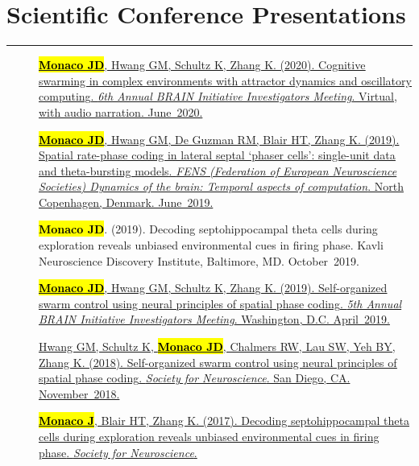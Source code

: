 \documentclass[10pt]{article}
\newcommand{\itemtitle}[1]{{\color{hopkinsblue}\ul{#1}}}
\newcommand{\unpubtitle}[1]{{\color{hopkinsblue} #1}}
\newcommand{\joehl}[1]{\hl{\textbf{#1}}}
\newcommand{\newsection}[2]{%
  \section*{#1}
  \vspace{-.125in}
  \hrule
  \vspace{.22in}
  \label{sec:#2}
}
\begin{document}
\smallskip
\newsection{Scientific Conference Presentations}{posters}

\begin{description}
  \item[\quad]
    \href{https://www.cvent.com/events/6th-annual-brain-initiative-investigators-meeting/custom-116-4e2aadaa6cd549a3a4b53113cd172ad2.aspx}
    {\joehl{Monaco JD}, Hwang GM, Schultz K, Zhang K. (2020).
      \itemtitle{Cognitive swarming in complex environments with attractor
      dynamics and oscillatory computing}. \emph{6th Annual BRAIN Initiative
    Investigators Meeting}. Virtual, with audio narration. June~2020.}
  \item[\quad]
    \href{https://www.fens.org/Meetings/The-Brain-Conferences/Dynamics-of-the-brain/}
    {\joehl{Monaco JD}, Hwang GM, De Guzman RM, Blair HT, Zhang K. (2019).
      \itemtitle{Spatial rate-phase coding in lateral septal ‘phaser cells’:
      single-unit data and theta-bursting models}. \emph{FENS (Federation of
        European Neuroscience Societies) Dynamics of the brain: Temporal aspects of
    computation}. North Copenhagen, Denmark. June~2019.}
  \item[\quad]
    \joehl{Monaco JD}. (2019). \unpubtitle{Decoding septohippocampal theta cells
    during exploration reveals unbiased environmental cues in firing phase}.
    Kavli Neuroscience Discovery Institute, Baltimore, MD. October~2019.
  \item[\quad]
    \href{https://www.cvent.com/events/5th-annual-brain-initiative-investigators-meeting/event-summary-de9c0d8f934b46eb8d80b55bcfbfe96a.aspx}
    {\joehl{Monaco JD}, Hwang GM, Schultz K, Zhang K. (2019).
      \itemtitle{Self-organized swarm control using neural principles of spatial
      phase coding}. \emph{5th Annual BRAIN Initiative Investigators Meeting}.
    Washington, D.C. April~2019.} 
  \item[\quad]
    \href{https://abstractsonline.com/pp8/#!/4649/presentation/10884}
    {Hwang GM, Schultz K, \joehl{Monaco JD}, Chalmers RW, Lau SW, Yeh BY,
      Zhang K. (2018). \itemtitle{Self-organized swarm control using neural
      principles of spatial phase coding}. \emph{Society for Neuroscience}.
    San Diego, CA. November~2018.}
  \item[\quad]
    \href{https://www.abstractsonline.com/pp8/#!/4376/presentation/6085}
    {\joehl{Monaco J}, Blair HT, Zhang K. (2017). \itemtitle{Decoding
        septohippocampal theta cells during exploration reveals unbiased
      environmental cues in firing phase}. \emph{Society for Neuroscience}.
}
\end{description}
\end{document}
